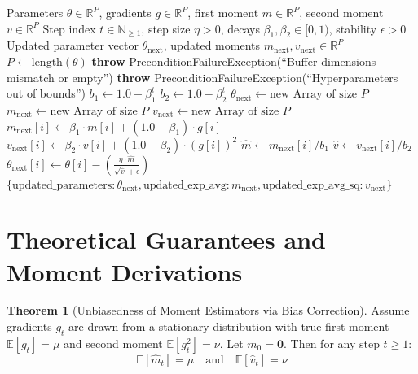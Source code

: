 \documentclass[11pt,a4paper]{article}
\theoremstyle{definition}
\newtheorem{theorem}{Theorem}[section]
\begin{document}
\begin{algorithm}[H]
\caption{Adaptive Moment Estimation (Adam) Step Update}
\begin{algorithmic}[1]
\Require Parameters $\theta \in \mathbb{R}^P$, gradients $g \in \mathbb{R}^P$, first moment $m \in \mathbb{R}^P$, second moment $v \in \mathbb{R}^P$
\Require Step index $t \in \mathbb{N}_{\ge 1}$, step size $\eta > 0$, decays $\beta_1, \beta_2 \in [0, 1)$, stability $\epsilon > 0$
\Ensure Updated parameter vector $\theta_{\text{next}}$, updated moments $m_{\text{next}}, v_{\text{next}} \in \mathbb{R}^P$
\State $P \gets \text{length}(\theta)$
    \State \textbf{throw} PreconditionFailureException(``Buffer dimensions mismatch or empty'')
\EndIf
{}
    \State \textbf{throw} PreconditionFailureException(``Hyperparameters out of bounds'')
\EndIf
\State $b_1 \gets 1.0 - \beta_1^t$
\State $b_2 \gets 1.0 - \beta_2^t$
\State $\theta_{\text{next}} \gets \text{new Array of size } P$
\State $m_{\text{next}} \gets \text{new Array of size } P$
\State $v_{\text{next}} \gets \text{new Array of size } P$
    \State $m_{\text{next}}[i] \gets \beta_1 \cdot m[i] + (1.0 - \beta_1) \cdot g[i]$
    \State $v_{\text{next}}[i] \gets \beta_2 \cdot v[i] + (1.0 - \beta_2) \cdot (g[i])^2$
    \State $\hat{m} \gets m_{\text{next}}[i] / b_1$
    \State $\hat{v} \gets v_{\text{next}}[i] / b_2$
    \State $\theta_{\text{next}}[i] \gets \theta[i] - \left(\frac{\eta \cdot \hat{m}}{\sqrt{\hat{v}} + \epsilon}\right)$
\EndFor
\State \Return $\{\text{updated\_parameters}: \theta_{\text{next}}, \text{updated\_exp\_avg}: m_{\text{next}}, \text{updated\_exp\_avg\_sq}: v_{\text{next}}\}$
\end{algorithmic}
\end{algorithm}

\section{Theoretical Guarantees and Moment Derivations}

\begin{theorem}[Unbiasedness of Moment Estimators via Bias Correction]
Assume gradients $g_t$ are drawn from a stationary distribution with true first moment $\mathbb{E}[g_t] = \mu$ and second moment $\mathbb{E}[g_t^2] = \nu$. Let $m_0 = \mathbf{0}$. Then for any step $t \ge 1$:
\begin{equation}
\mathbb{E}[\hat{m}_t] = \mu \quad \text{and} \quad \mathbb{E}[\hat{v}_t] = \nu
\end{equation}
\end{theorem}
\end{document}
